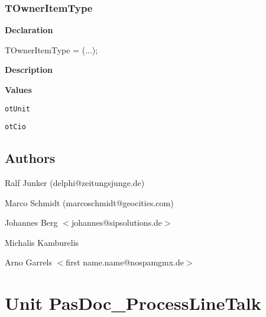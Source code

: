 \documentclass{report}
\newif\ifpdf
\begin{document}
\subsection*{TOwnerItemType}
\fi
\label{PasDoc_Parser-TOwnerItemType}
\begin{list}{}{
\setlength{\itemindent}{0cm}
\setlength{\listparindent}{0cm}
\setlength{\leftmargin}{\evensidemargin}
\addtolength{\leftmargin}{\tmplength}
\settowidth{\labelsep}{X}
\addtolength{\leftmargin}{\labelsep}
\setlength{\labelwidth}{\tmplength}
}
\item[\textbf{Declaration}\hfill]
\ifpdf
\begin{flushleft}
\fi
\begin{ttfamily}
TOwnerItemType = (...);\end{ttfamily}

\ifpdf
\end{flushleft}
\fi

\par
\item[\textbf{Description}]
 \item[\textbf{Values}]
\begin{description}
\item[\texttt{otUnit}] \label{PasDoc_Parser-otUnit}
\index{}
 
\item[\texttt{otCio}] \label{PasDoc_Parser-otCio}
\index{}
 
\end{description}


\end{list}
\section{Authors}
\par
Ralf Junker (delphi@zeitungsjunge.de)

\par
Marco Schmidt (marcoschmidt@geocities.com)

\par
Johannes Berg {$<$}johannes@sipsolutions.de{$>$}

\par
Michalis Kamburelis

\par
Arno Garrels {$<$}first name.name@nospamgmx.de{$>$}

\chapter{Unit PasDoc{\_}ProcessLineTalk}
\label{PasDoc_ProcessLineTalk}
\end{document}
